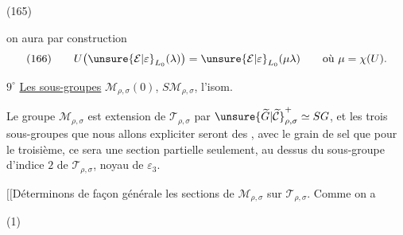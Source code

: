 \begin{samepage}
\noindent (165)\quad
{}
\end{samepage}

on aura par  construction
\[
\text{(166)}\qquad
U\bigl(\unsure{\mathcal E|\varepsilon}_{L_0}(\lambda)\bigr)
=\unsure{\mathcal E|\varepsilon}_{L_0}(\mu\lambda)
\qquad\text{où }\mu=\chi(U).
\]




 \textcircled{$9^\circ$} \uline{Les sous-groupes}
$\mathcal M_{\rho,\sigma}(0)$,
$S\mathcal M_{\rho,\sigma}$, l'isom.

Le groupe $\mathcal M_{\rho,\sigma}$ est extension de $\mathcal T_{\rho,\sigma}$ par
$\unsure{\widetilde G|\widetilde{\mathcal C}}^+_{\rho,\sigma}\simeq SG$, et les trois sous-groupes que nous allons
expliciter seront des ,  avec le
grain de sel que pour le troisième, ce sera une
section partielle seulement, au dessus du
sous-groupe  d'indice $2$ de $\mathcal T_{\rho,\sigma}$, noyau de
$\varepsilon_3$.

$[\![$Déterminons de façon générale les sections
de $\mathcal M_{\rho,\sigma}$ sur $\mathcal T_{\rho,\sigma}$. Comme on a

\begin{samepage}
\noindent (1)\quad
{}
\end{samepage}

